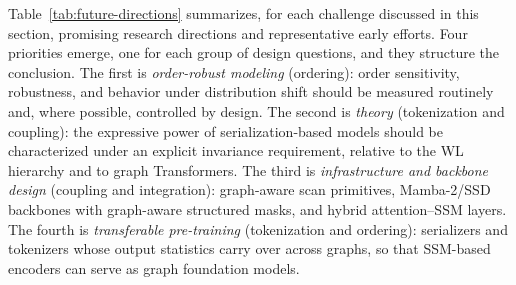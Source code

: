 \documentclass[acmsmall]{acmart}
\begin{document}
Table~\ref{tab:future-directions} summarizes, for each challenge discussed in
this section, promising research directions and representative early efforts.
Four priorities emerge, one for each group of design questions, and they structure the conclusion. The first is \emph{order-robust modeling} (ordering): order sensitivity, robustness, and behavior under distribution shift should be measured routinely and, where possible, controlled by design. The second is \emph{theory} (tokenization and coupling): the expressive power of serialization-based models should be characterized under an explicit invariance requirement, relative to the WL hierarchy and to graph Transformers. The third is \emph{infrastructure and backbone design} (coupling and integration): graph-aware scan primitives, Mamba-2/SSD backbones with graph-aware structured masks, and hybrid attention--SSM layers. The fourth is \emph{transferable pre-training} (tokenization and ordering): serializers and tokenizers whose output statistics carry over across graphs, so that SSM-based encoders can serve as graph foundation models.
\end{document}
